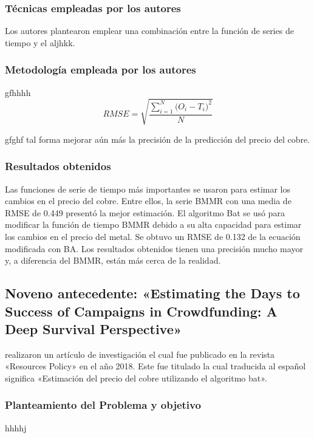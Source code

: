 \subsubsection{Técnicas empleadas por los autores}
Los autores plantearon emplear una combinación entre la función de series de tiempo y el aljhkk. 

\subsubsection{Metodología empleada por los autores}
gfhhhh
\begin{equation}  
\label{eq:RMSE}
RMSE = \sqrt{\frac{\sum_{i=1}^{N}{\Big(O_i -T_i\Big)^2}}{N}}
\end{equation}

gfghf tal forma mejorar aún más la precisión de la predicción del precio del cobre.

\subsubsection{Resultados obtenidos}
Las funciones de serie de tiempo más importantes se usaron para estimar los cambios en el precio del cobre. Entre ellos, la serie BMMR con una media de RMSE de 0.449 presentó la mejor estimación. El algoritmo Bat  se usó para modificar la función de tiempo BMMR debido a su alta capacidad para estimar los cambios en el precio del metal. Se obtuvo un RMSE de 0.132 de la ecuación modificada con BA. Los resultados obtenidos tienen una precisión mucho mayor y, a diferencia del BMMR, están más cerca de la realidad.


\subsection{Noveno antecedente: «Estimating the Days to Success of Campaigns in Crowdfunding: A Deep Survival Perspective» \citep*{pr_jin2019dayssuccess}}
\citeauthor{pr_jin2019dayssuccess} realizaron un artículo de investigación el cual fue publicado en la revista «Resources Policy» en el año 2018. Este fue titulado  la cual traducida al español significa «Estimación del precio del cobre utilizando el algoritmo bat».

\subsubsection{Planteamiento del Problema y objetivo }
hhhhj

